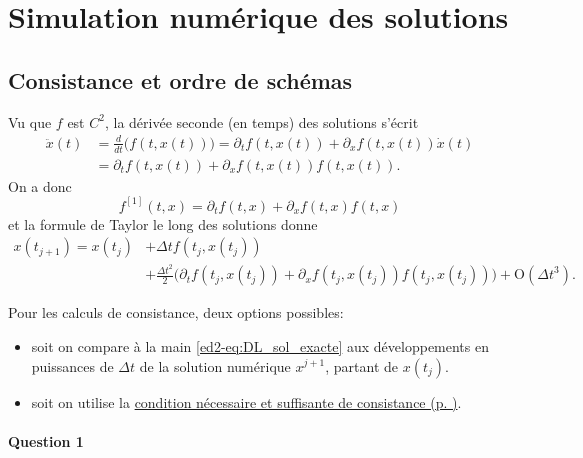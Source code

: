 \hypertarget{ed2-corrections}{%
\chapter{Simulation numérique des solutions}\label{ed2-corrections}}

\hypertarget{ed2-correc_consist}{%
\section{Consistance et ordre de schémas}\label{ed2-correc_consist}}

Vu que \(f\) est \(C^2\), la dérivée seconde (en temps) des solutions
s'écrit \begin{align*}
\ddot{x}(t) &= \frac{d}{dt}\Big( f(t,x(t)) \Big) = \partial_t f(t,x(t))+ \partial_x f(t,x(t)) \dot{x}(t)\\ 
&= \partial_t f(t,x(t))+ \partial_x f(t,x(t)) f(t,x(t)).
\end{align*} On a donc \[
f^{[1]}(t,x) = \partial_t f(t,x)+ \partial_x f(t,x) f(t,x)
\] et la formule de Taylor le long des solutions donne \begin{equation}
\label{ed2-eq:DL_sol_exacte}
\begin{aligned}
x(t_{j+1}) = x(t_j) & + {\Delta t}f(t_j,x(t_j)) \\
& + \frac{{\Delta t}^2}{2} \Big( \partial_t f(t_j,x(t_j)) + \partial_x f(t_j,x(t_j)) f(t_j,x(t_j)) \Big) + \mathrm{O}({\Delta t}^3).
\end{aligned}
\end{equation}

Pour les calculs de consistance, deux options possibles:

\begin{itemize}
\item
  soit on compare à la main \eqref{ed2-eq:DL_sol_exacte} aux développements
  en puissances de \({\Delta t}\) de la solution numérique \(x^{j+1}\),
  partant de \(x(t_j)\).
\item
  soit on utilise la
  \protect\hyperlink{ed2-theo_CS_consistance_ordre_p}{condition nécessaire
  et suffisante de consistance (p.
  \pageref*{ed2-theo_CS_consistance_ordre_p})}.
\end{itemize}

\hypertarget{ed2-answer-consist-1}{%
\subsubsection*{Question 1}\label{ed2-answer-consist-1}}

